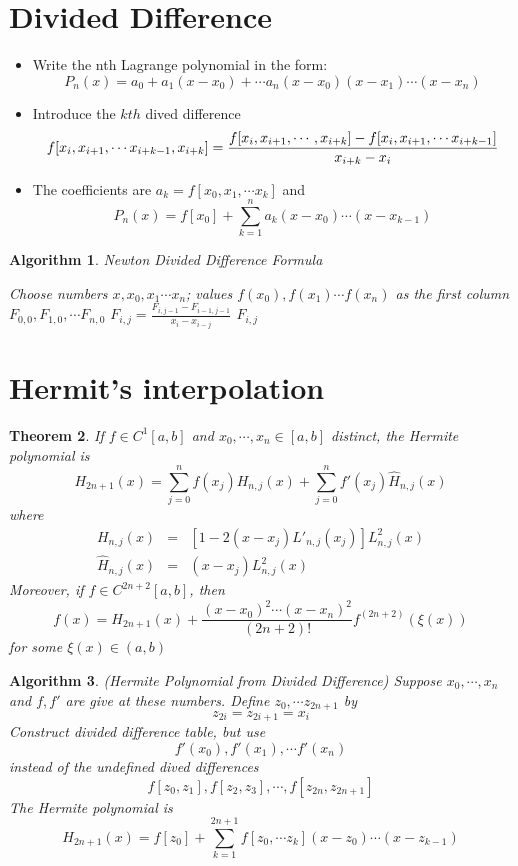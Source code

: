 \documentclass[12pt]{article}
\newtheorem{theorem}{Theorem}[subsection]
\newtheorem{alg}[theorem]{Algorithm}
\begin{document}
\section{Divided Difference}
\begin{itemize}
	\item Write the nth Lagrange polynomial in the form: 
	$$P_n(x) = a_0 +a_1(x - x_0) +\cdots a_n(x - x_0)(x - x_1) \cdots (x-x_n)$$
	\item Introduce the $kth$ dived difference
	$$
		f[x_i, x_{i+1}, \cdots x_{i+k-1}, x_{i+k}]  =  \\
		\frac{f[x_i, x_{i+1}, \cdots, x_{i+k}] - f[x_i, x_{i+1}, \cdots x_{i+k-1}]}{x_{i+k} - x_i}
	$$
	\item The coefficients are $a_k = f[x_0,x_1, \cdots x_k]$ and 
	$$P_n(x) = f[x_0] + \sum_{k=1}^{n}a_k(x - x_0) \cdots (x - x_{k-1})$$
\end{itemize}
\begin{alg}{Newton Divided Difference Formula}
\begin{algorithmic}
Choose numbers $x,x_0,x_1 \cdots x_n$; values $f(x_0), f(x_1) \cdots f(x_n)$ as the first column $F_{0,0}, F_{1,0}, \cdots F_{n,0}$ 
\State $F_{i,j} = \frac{F_{i,j-1} -F_{i-1,j-1}}{x_i - x_{i-j}}$
\EndFor
\EndFor
\State \Return $F_{i,j}$
\end{algorithmic}


\end{alg}

\section{Hermit's interpolation}
\begin{theorem}
	If $f \in C^1[a,b]$ and $x_0, \cdots, x_n \in [a,b]$ distinct, the Hermite polynomial is 
	$$H_{2n+1}(x) = \sum_{j=0}^n f(x_j)H_{n,j}(x) + \sum_{j=0}^n f'(x_j)\hat{H}_{n,j}(x)$$
	where 
	\begin{eqnarray*}		
	H_{n,j}(x) &=& [1 - 2(x - x_j)L'_{n,j}(x_j)]L^2_{n,j}(x) \\
	\hat{H}_{n,j}(x) &=& (x - x_j)L^2_{n,j}(x)
	\end{eqnarray*}
	Moreover, if $f \in C^{2n+2}[a,b]$, then 
	$$f(x) = H_{2n+1}(x) + \frac{(x - x_0)^2 \cdots (x - x_n)^2}{(2n+2)!}f^{(2n+2)}(\xi(x))$$
	for some $\xi(x) \in (a,b)$
\end{theorem}
\begin{alg}{(Hermite Polynomial from Divided Difference)}
\newline Suppose $x_0, \cdots, x_n$and $f,f'$ are give at these numbers. Define $z_0, \cdots z_{2n+1}$ by 
$$z_{2i} = z_{2i+1} = x_i$$
Construct divided difference table, but use 
$$f'(x_0), f'(x_1), \cdots f'(x_n)$$
instead of the undefined dived differences 
$$f[z_0,z_1], f[z_2,z_3], \cdots, f[z_{2n},z_{2n+1}]$$
The Hermite polynomial is 
$$H_{2n+1}(x) = f[z_0] +\sum_{k=1}^{2n+1}f[z_0, \cdots z_k](x - z_0) \cdots (x - z_{k-1})$$	
\end{alg}
\end{document}
